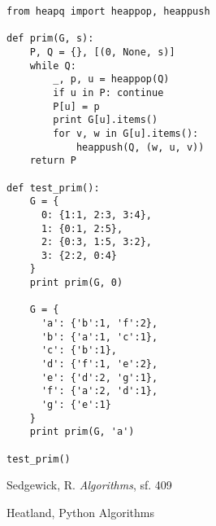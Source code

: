 \documentclass[12pt,fleqn]{article}\usepackage{../common}
\begin{document}
\begin{verbatim}
from heapq import heappop, heappush

def prim(G, s):
    P, Q = {}, [(0, None, s)]
    while Q:
        _, p, u = heappop(Q)
        if u in P: continue
        P[u] = p
        print G[u].items()
        for v, w in G[u].items():
            heappush(Q, (w, u, v))
    return P

def test_prim():    
    G = {
      0: {1:1, 2:3, 3:4},
      1: {0:1, 2:5},
      2: {0:3, 1:5, 3:2},
      3: {2:2, 0:4}
    }
    print prim(G, 0)

    G = {
      'a': {'b':1, 'f':2},
      'b': {'a':1, 'c':1},
      'c': {'b':1},
      'd': {'f':1, 'e':2},
      'e': {'d':2, 'g':1},
      'f': {'a':2, 'd':1},
      'g': {'e':1}
    }
    print prim(G, 'a')

test_prim()
\end{verbatim}



Sedgewick, R. {\em Algorithms}, sf. 409

Heatland, Python Algorithms
\end{document}
